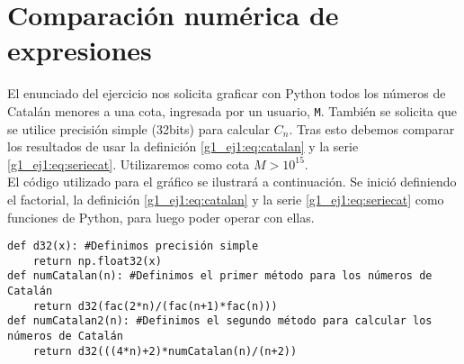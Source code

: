\documentclass[../portafolio.tex]{subfiles}
\begin{document}
\section{Comparación numérica de expresiones}
El enunciado del ejercicio nos solicita graficar con Python todos los números de Catalán menores a una cota, ingresada por un usuario, \texttt{M}. También se solicita que se utilice precisión simple (32bits) para calcular $C_n$. Tras esto debemos comparar los resultados de usar la definición \eqref{g1_ej1:eq:catalan} y la serie \eqref{g1_ej1:eq:seriecat}. Utilizaremos como cota $M>10^{15}$.\\

El código utilizado para el gráfico se ilustrará a continuación. Se inició definiendo el factorial, la definición \eqref{g1_ej1:eq:catalan} y la serie \eqref{g1_ej1:eq:seriecat} como funciones de Python, para luego poder operar con ellas.
\begin{verbatim}
def d32(x): #Definimos precisión simple 
    return np.float32(x)
def numCatalan(n): #Definimos el primer método para los números de Catalán
    return d32(fac(2*n)/(fac(n+1)*fac(n)))
def numCatalan2(n): #Definimos el segundo método para calcular los números de Catalán
    return d32(((4*n)+2)*numCatalan(n)/(n+2))
\end{verbatim}
\end{document}
